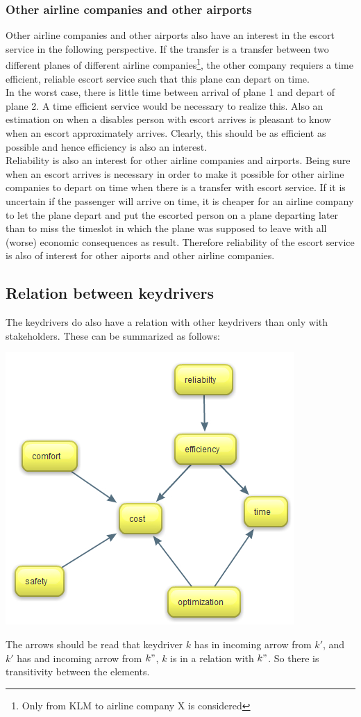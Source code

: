 \documentclass[a4paper, 11pt, notitlepage]{report}
\begin{document}
\subsubsection{Other airline companies and other airports}
Other airline companies and other airports also have an interest in the escort service in the following perspective. If the transfer is a transfer between two different planes of different airline companies\footnote{Only from KLM to airline company X is considered}, the other company requiers a time efficient, reliable escort service such that this plane can depart on time.\\
In the worst case, there is little time between arrival of plane 1 and depart of plane 2. A time efficient service would be necessary to realize this. Also an estimation on when a disables person with escort arrives is pleasant to know when an escort approximately arrives. Clearly, this should be as efficient as possible and hence efficiency is also an interest.\\
Reliability is also an interest for other airline companies and airports. Being sure when an escort arrives is necessary in order to make it possible for other airline companies to depart on time when there is a transfer with escort service. If it is uncertain if the passenger will arrive on time, it is cheaper for an airline company to let the plane depart and put the escorted person on a plane departing later than to miss the timeslot in which the plane was supposed to leave with all (worse) economic consequences as result. Therefore reliability of the escort service is also of interest for other aiports and other airline companies.
\newpage
\subsection{Relation between keydrivers}
The keydrivers do also have a relation with other keydrivers than only with stakeholders. These can be summarized as follows:
\begin{center}
	\includegraphics[scale=0.45]{figures/relationkeydrivers.jpg}
\end{center}
The arrows should be read that keydriver $k$ has in incoming arrow from $k'$, and $k'$ has and incoming arrow from $k"$, $k$ is in a relation with $k"$. So there is transitivity between the elements.
\end{document}
